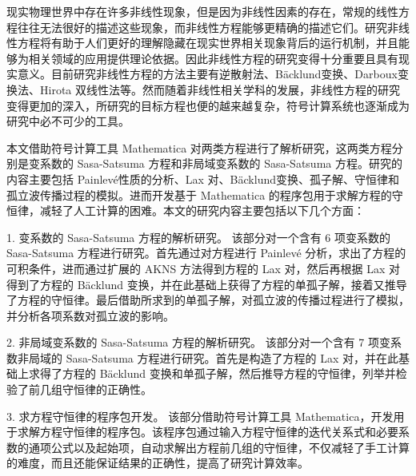


\begin{cabstract}
现实物理世界中存在许多非线性现象，但是因为非线性因素的存在，常规的线性方程往往无法很好的描述这些现象，而非线性方程能够更精确的描述它们。研究非线性方程将有助于人们更好的理解隐藏在现实世界相关现象背后的运行机制，并且能够为相关领域的应用提供理论依据。因此非线性方程的研究变得十分重要且具有现实意义。目前研究非线性方程的方法主要有逆散射法、B\"{a}cklund变换、Darboux变换法、Hirota 双线性法等。然而随着非线性相关学科的发展，非线性方程的研究变得更加的深入，所研究的目标方程也便的越来越复杂，符号计算系统也逐渐成为研究中必不可少的工具。

本文借助符号计算工具 Mathematica 对两类方程进行了解析研究，这两类方程分别是变系数的 Sasa-Satsuma 方程和非局域变系数的 Sasa-Satsuma 方程。研究的内容主要包括 Painlev\'{e}性质的分析、Lax 对、B\"{a}cklund变换、孤子解、守恒律和孤立波传播过程的模拟。进而开发基于 Mathematica 的程序包用于求解方程的守恒律，减轻了人工计算的困难。本文的研究内容主要包括以下几个方面：

1. 变系数的 Sasa-Satsuma 方程的解析研究。
该部分对一个含有 6 项变系数的 Sasa-Satsuma 方程进行研究。首先通过对方程进行 Painlev\'{e} 分析，求出了方程的可积条件，进而通过扩展的 AKNS 方法得到方程的 Lax 对，然后再根据 Lax 对得到了方程的 B\"{a}cklund 变换，并在此基础上获得了方程的单孤子解，接着又推导了方程的守恒律。最后借助所求到的单孤子解，对孤立波的传播过程进行了模拟，并分析各项系数对孤立波的影响。

2. 非局域变系数的 Sasa-Satsuma 方程的解析研究。
该部分对一个含有 7 项变系数非局域的 Sasa-Satsuma 方程进行研究。首先是构造了方程的 Lax 对，并在此基础上求得了方程的 B\"{a}cklund 变换和单孤子解，然后推导方程的守恒律，列举并检验了前几组守恒律的正确性。

3. 求方程守恒律的程序包开发。
该部分借助符号计算工具 Mathematica，开发用于求解方程守恒律的程序包。该程序包通过输入方程守恒律的迭代关系式和必要系数的通项公式以及起始项，自动求解出方程前几组的守恒律，不仅减轻了手工计算的难度，而且还能保证结果的正确性，提高了研究计算效率。

\end{cabstract}


